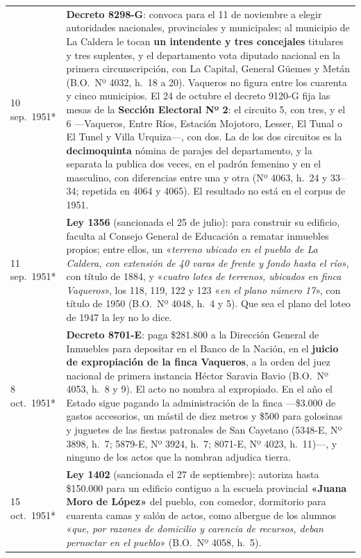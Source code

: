 \begin{longtable}{@{}p{2.7cm}p{10.3cm}@{}}
10 sep.\ 1951* & \textbf{Decreto 8298-G}: convoca para el 11 de noviembre a elegir autoridades nacionales, provinciales y municipales; al municipio de La Caldera le tocan \textbf{un intendente y tres concejales} titulares y tres suplentes, y el departamento vota diputado nacional en la primera circunscripción, con La Capital, General Güemes y Metán (B.O.\ Nº 4032, h.\ 18 a 20). Vaqueros no figura entre los cuarenta y cinco municipios. El 24 de octubre el decreto 9120-G fija las mesas de la \textbf{Sección Electoral Nº 2}: el circuito 5, con tres, y el 6 ---Vaqueros, Entre Ríos, Estación Mojotoro, Lesser, El Tunal o El Tunel y Villa Urquiza---, con dos. La de los dos circuitos es la \textbf{decimoquinta} nómina de parajes del departamento, y la separata la publica dos veces, en el padrón femenino y en el masculino, con diferencias entre una y otra (Nº 4063, h.\ 24 y 33--34; repetida en 4064 y 4065). El resultado no está en el corpus de 1951. \\
11 sep.\ 1951* & \textbf{Ley 1356} (sancionada el 25 de julio): para construir su edificio, faculta al Consejo General de Educación a rematar inmuebles propios; entre ellos, un «\textit{terreno ubicado en el pueblo de La Caldera, con extensión de 40 varas de frente y fondo hasta el río}», con título de 1884, y «\textit{cuatro lotes de terrenos, ubicados en finca Vaqueros}», los 118, 119, 122 y 123 «\textit{en el plano número 17}», con título de 1950 (B.O.\ Nº 4048, h.\ 4 y 5). Que sea el plano del loteo de 1947 la ley no lo dice. \\
8 oct.\ 1951* & \textbf{Decreto 8701-E}: paga \$281.800 a la Dirección General de Inmuebles para depositar en el Banco de la Nación, en el \textbf{juicio de expropiación de la finca Vaqueros}, a la orden del juez nacional de primera instancia Héctor Saravia Bavio (B.O.\ Nº 4053, h.\ 8 y 9). El acto no nombra al expropiado. En el año el Estado sigue pagando la administración de la finca ---\$3.000 de gastos accesorios, un mástil de diez metros y \$500 para golosinas y juguetes de las fiestas patronales de San Cayetano (5348-E, Nº 3898, h.\ 7; 5879-E, Nº 3924, h.\ 7; 8071-E, Nº 4023, h.\ 11)---, y ninguno de los actos que la nombran adjudica tierra. \\
15 oct.\ 1951* & \textbf{Ley 1402} (sancionada el 27 de septiembre): autoriza hasta \$150.000 para un edificio contiguo a la escuela provincial \textbf{«Juana Moro de López»} del pueblo, con comedor, dormitorio para cuarenta camas y salón de actos, como albergue de los alumnos «\textit{que, por razones de domicilio y carencia de recursos, deban pernoctar en el pueblo}» (B.O.\ Nº 4058, h.\ 5). \\

\end{longtable}
